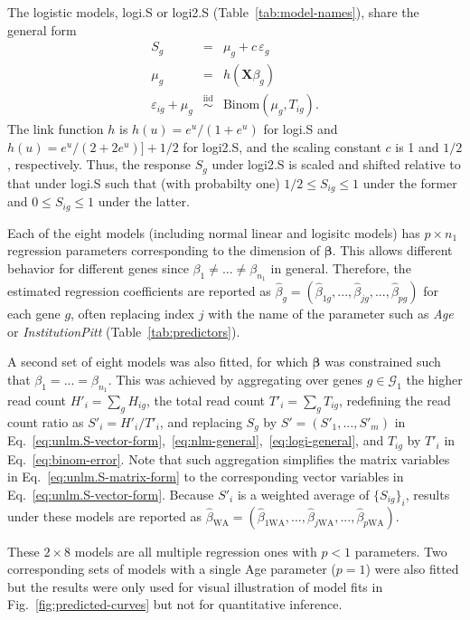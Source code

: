 \documentclass[letterpaper]{article}
\begin{document}
The logistic models, logi.S or logi2.S (Table~\ref{tab:model-names}), share the general form
\begin{eqnarray}
S_g &=& \mu_g + c\, \varepsilon_g
\label{eq:logi-general}
\\
\mu_g &=& h(\mathbf{X} \beta_g)
\label{eq:glm-mean-predictor}
\\
\varepsilon_{ig} + \mu_g &\overset{\mathrm{iid}}{\sim}& \mathrm{Binom}(\mu_g, T_{ig}).
\label{eq:binom-error}
\end{eqnarray}
The link function \(h\) is \(h(u) = e^u / (1 + e^u)\) for logi.S and \(h(u) =
e^u / (2 + 2e^u)] + 1/2\) for logi2.S, and the scaling constant \(c\) is 1
 and \(1/2\), respectively.  Thus, the response \(S_g\) under logi2.S is scaled and shifted relative to
that under logi.S such that (with probabilty one) \(1/2\le S_{ig}\le 1\) under the former and
\(0\le S_{ig}\le 1\) under the latter.

Each of the eight models (including normal linear and logisitc models) has \(p\times n_1\) regression parameters corresponding to the
dimension of \(\boldsymbol{\beta}\).  This allows different behavior for
different genes since \(\beta_1\neq ...\neq\beta_{n_1}\) in general.
Therefore, the estimated regression coefficients are reported as \(\hat{\beta}_g =
(\hat{\beta}_{1g},...,\hat{\beta}_{jg},...,\hat{\beta}_{pg})\) for each gene \(g\), often
replacing index \(j\) with the name of the parameter such as \emph{Age} or
\emph{InstitutionPitt} (Table~\ref{tab:predictors}).

A second set of eight models was also
fitted, for which \(\boldsymbol{\beta}\) was constrained such that \(\beta_1 =
... = \beta_{n_1}\).  This was achieved by aggregating over genes
\(g\in\mathcal{G}_1\) the higher read count \(H'_i = \sum_g H_{ig}\), the
total read count \(T'_i = \sum_g T_{ig}\), redefining the read count ratio
as \(S'_i = H'_i / T'_i\), and replacing \(S_g\) by \(S'=(S'_1,...,S'_m)\) in
Eq.~\ref{eq:unlm.S-vector-form},~\ref{eq:nlm-general},~\ref{eq:logi-general}, and \(T_{ig}\) by \(T'_i\) in
Eq.~\ref{eq:binom-error}.  Note that such aggregation
simplifies the matrix variables in Eq.~\ref{eq:unlm.S-matrix-form} to the
corresponding vector variables in Eq.~\ref{eq:unlm.S-vector-form}.  Because \(S'_i\) is a
weighted average of \(\{S_{ig}\}_i\), results under these models are reported
as \(\hat{\beta}_\mathrm{WA} =
(\hat{\beta}_{1\mathrm{WA}},...,\hat{\beta}_{j\mathrm{WA}},...,\hat{\beta}_{p\mathrm{WA}})\).

These \(2\times 8\) models are all multiple regression ones with \(p<1\)
parameters.  Two corresponding sets of models with a single Age parameter
(\(p=1\)) were also fitted but the results were only used for visual
illustration of model fits in Fig.~\ref{fig:predicted-curves} but not for
quantitative inference.
\end{document}
